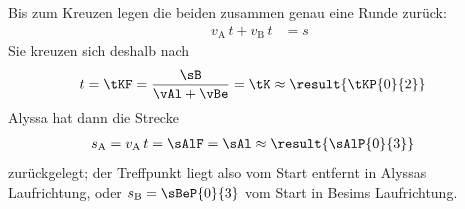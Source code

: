\begin{center}
\end{center}

Bis zum Kreuzen legen die beiden zusammen genau eine Runde zurück:
\begin{align}
 v_\mathrm{A}\,t + v_\mathrm{B}\,t &= s
\end{align}
Sie kreuzen sich deshalb nach
\begin{align}
 t &= \tKF = \frac{\sB}{\vAl+\vBe} = \tK \approx \result{\tKP{0}{2}}
\end{align}
Alyssa hat dann die Strecke
\begin{align}
 s_\mathrm{A} &= v_\mathrm{A}\,t = \sAlF = \sAl \approx \result{\sAlP{0}{3}}
\end{align}
zurückgelegt; der Treffpunkt liegt also  vom Start entfernt in Alyssas Laufrichtung, oder $s_\mathrm{B} = \sBeP{0}{3}$ vom Start in Besims Laufrichtung.
